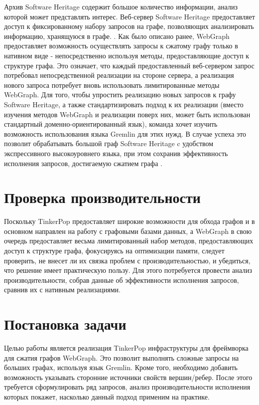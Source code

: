\documentclass[times,specification,annotation]{itmo-student-thesis}
\begin{document}
Архив Software Heritage содержит большое количество информации, анализ которой может представлять интерес. Веб-сервер Software Heritage предоставляет доступ к фиксированному набору запросов на графе, позволяющих анализировать информацию, хранящуюся в графе. \cite{swh-api}. Как было описано ранее, WebGraph предоставляет возможность осуществлять запросы к сжатому графу только в нативном виде - непосредственно используя методы, предоставляющие доступ к структуре графа. Это означает, что каждый предоставленный веб-сервером запрос потребовал непосредственной реализации на стороне сервера, а реализация нового запроса потребует вновь использовать лимитированные методы WebGraph. Для того, чтобы упростить реализацию новых запросов к графу Software Heritage, а также стандартизировать подход к их реализации (вместо изучения методов WebGraph и реализации поверх них, может быть использован стандартный доменно-ориентированный язык), команда хочет изучить возможность использования языка Gremlin для этих нужд. В случае успеха это позволит обрабатывать большой граф Software Heritage c удобством экспрессивного высокоуровнего языка, при этом сохранив эффективность исполнения запросов, достигаемую сжатием графа \cite{swh-intern}.

\section{Проверка производительности}

Поскольку TinkerPop предоставляет широкие возможности для обхода графов и в основном направлен на работу с графовыми базами данных, а WebGraph в свою очередь предоставляет весьма лимитированный набор методов, предоставляющих доступ к структуре графа, фокусируясь на оптимизации памяти, следует проверить, не внесет ли их связка проблем с производительностью, и убедиться, что решение имеет практическую пользу. Для этого потребуется провести анализ производительности, собрав данные об эффективности исполнения запросов, сравнив их с нативным реализациями.

\section{Постановка задачи}

Целью работы является реализация TinkerPop инфраструктуры для фреймворка для сжатия графов WebGraph. Это позволит выполнять сложные запросы на больших графах, используя язык Gremlin. Кроме того, необходимо добавить возможность указывать сторонние источники свойств вершин/ребер. После этого требуется сформулировать ряд запросов, анализ производительности исполнения которых покажет, насколько данный подход применим на практике.
\end{document}
